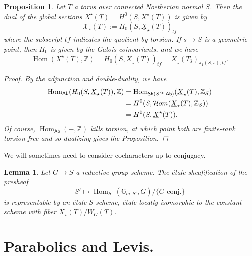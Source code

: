 \documentclass[openany]{amsbook}
\newtheorem{lemma}[theorem]{Lemma}
\newtheorem{proposition}[theorem]{Proposition}
\theoremstyle{definition}
\theoremstyle{remark}
\numberwithin{equation}{section}
\newcommand{\Z}{\mathbb{Z}}
\newcommand{\G}{\mathbb{G}}
\newcommand{\cX}{\mathcal{X}}
\newcommand{\ol}[1]{\overline{#1}}
\newcommand{\ul}[1]{\underline{#1}}
\renewcommand{\-}{\operatorname{-}}
\newcommand{\Hom}{\operatorname{Hom}}
\newcommand{\Ab}{\mathsf{Ab}}
\newcommand{\Sh}{\mathsf{Sh}}
\newcommand{\sHom}{\mathcal{H}\kern -.5pt om}
\newcommand{\et}{\acute{e}t}
\newcommand{\tf}{\mathit{tf}}
\begin{document}
\begin{proposition}\label{prop.dual.lattice.global.invs.coinvs.mod.tors}
    Let $T$ a torus over connected Noetherian normal $S$. Then the dual of the global sections $X^\star(T) = H^0(S, \ul{X}^\star(T))$ is given by
    $$
        \cX_\star(T) := H_0(S, \ul{X}_\star(T))_{\tf}
    $$
    where the subscript $\tf$ indicates the quotient by torsion. If $\ol{s} \to S$ is a geometric point, then $H_0$ is given by the Galois-coinvariants, and we have
$$\Hom(X^\star(T), \Z) = H_0(S, \ul{X}_\star(T))_{\tf} = \ul{X}_\star(T_{\ol{s}})_{\pi_1(S, \ol{s}), \tf}.$$
    
    \begin{proof}
        By the adjunction and double-duality, we have
        \begin{align*}
            \Hom_{\Ab}(H_0(S, \ul{X}_\star(T)), \Z) &= \Hom_{\Sh(S^{\et}, \Ab)}(\ul{X}_\star(T), \Z_S) \\
            &= H^0(S, \sHom(\ul{X}_\star(T), \Z_S)) \\
            &= H^0(S, \ul{X}^\star(T)). 
        \end{align*}
        Of course, $\Hom_{\Ab}(-, \Z)$ kills torsion, at which point both are finite-rank torsion-free and so dualizing gives the Proposition.
        
    \end{proof}
\end{proposition}


We will sometimes need to consider cocharacters up to conjugacy.

\begin{lemma}\label{lem.conj.cochars}
    Let $G \to S$ a reductive group scheme. The \'etale sheafification of the presheaf 
    $$
        S' \mapsto \Hom_{S'}(\G_{m,S'}, G)/\{G\text{-conj.}\}
    $$
    is representable by an \'etale $S$-scheme, \'etale-locally isomorphic to the constant scheme with fiber $X_\star(T)/W_G(T)$.
\end{lemma}


\section{Parabolics and Levis.} 
\end{document}
